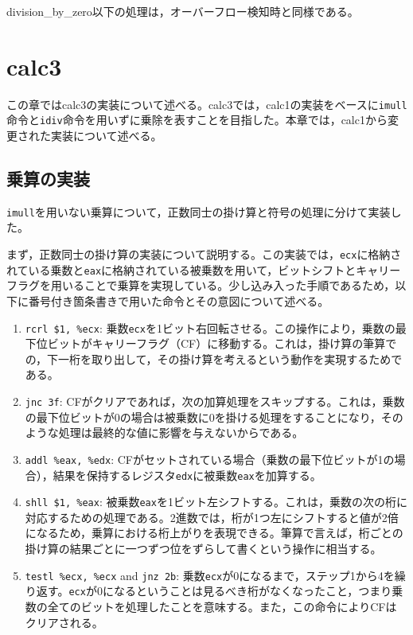 \documentclass[a4paper]{jsarticle}
\newcommand{\var}[1]{\texttt{#1}}
\begin{document}
division\_by\_zero以下の処理は，オーバーフロー検知時と同様である。

\section{calc3}
この章ではcalc3の実装について述べる。calc3では，calc1の実装をベースに\var{imull}命令と\var{idiv}命令を用いずに乗除を表すことを目指した。本章では，calc1から変更された実装について述べる。

\subsection{乗算の実装}
\var{imull}を用いない乗算について，正数同士の掛け算と符号の処理に分けて実装した。

まず，正数同士の掛け算の実装について説明する。この実装では，\var{ecx}に格納されている乗数と\var{eax}に格納されている被乗数を用いて，ビットシフトとキャリーフラグを用いることで乗算を実現している。少し込み入った手順であるため，以下に番号付き箇条書きで用いた命令とその意図について述べる。

\begin{enumerate}
    \item \var{rcrl \$1, \%ecx}: 乗数\var{ecx}を1ビット右回転させる。この操作により，乗数の最下位ビットがキャリーフラグ（CF）に移動する。これは，掛け算の筆算での，下一桁を取り出して，その掛け算を考えるという動作を実現するためである。
    \item \var{jnc 3f}: CFがクリアであれば，次の加算処理をスキップする。これは，乗数の最下位ビットが0の場合は被乗数に0を掛ける処理をすることになり，そのような処理は最終的な値に影響を与えないからである。
    \item \var{addl \%eax, \%edx}: CFがセットされている場合（乗数の最下位ビットが1の場合），結果を保持するレジスタ\var{edx}に被乗数\var{eax}を加算する。
    \item \var{shll \$1, \%eax}: 被乗数\var{eax}を1ビット左シフトする。これは，乗数の次の桁に対応するための処理である。2進数では，桁が1つ左にシフトすると値が2倍になるため，乗算における桁上がりを表現できる。筆算で言えば，桁ごとの掛け算の結果ごとに一つずつ位をずらして書くという操作に相当する。
    \item \var{testl \%ecx, \%ecx} and \var{jnz 2b}: 乗数\var{ecx}が0になるまで，ステップ1から4を繰り返す。\var{ecx}が0になるということは見るべき桁がなくなったこと，つまり乗数の全てのビットを処理したことを意味する。また，この命令によりCFはクリアされる。
\end{enumerate}
\end{document}
